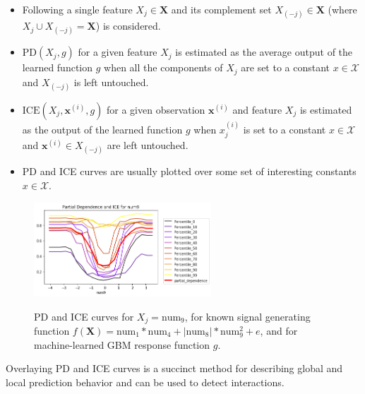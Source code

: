 \documentclass{article}
\begin{document}
\begin{itemize}
	
	\item Following \cite{esl} a single feature $X_j \in \mathbf{X}$ and its complement set $X_{(-j)} \in \mathbf{X}$ (where $X_j \cup X_{(-j)} = \mathbf{X}$) is considered.
	
	\item $\text{PD}(X_j, g)$ for a given feature $X_j$ is estimated as the average output of the learned function $g$ when all the components of $X_j$ are set to a constant $x \in \mathcal{X}$ and $X_{(-j)}$ is left untouched.
	
	\item $\text{ICE}(X_j, \mathbf{x}^{(i)}, g)$ for a given observation $\mathbf{x}^{(i)}$ and feature $X_j$ is estimated as the output of the learned function $g$ when $x^{(i)}_j$ is set to a constant $x \in \mathcal{X}$ and $\mathbf{x}^{(i)} \in X_{(-j)}$ are left untouched.
	
	\item PD and ICE curves are usually plotted over some set of interesting constants $x \in \mathcal{X}$. 

\end{itemize}

\begin{figure}[htb]
	\begin{center}
		\includegraphics[height=100pt]{img/pdp_ice.png}
		\label{fig:pdp_ice}
		\caption{PD and ICE curves for $ X_j = \text{num}_9$, for known signal generating function $f(\mathbf{X}) = \text{num} _1 * \text{num}_4 + |\text{num}_8| * \text{num}_9^2 + e$, and for machine-learned GBM response function $g$.}
	\end{center}
\end{figure}

\vspace{-10pt}

Overlaying PD and ICE curves is a succinct method for describing global and local prediction behavior and can be used to detect interactions. \cite{ice_plots} 
\end{document}
